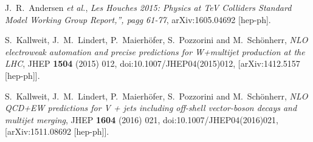 \documentclass{PoS}
\begin{document}
\begin{thebibliography}{99}
  J.~R.~Andersen {\it et al.},
  {\it Les Houches 2015: Physics at TeV Colliders Standard Model Working Group Report,'', pagg 61-77},
  arXiv:1605.04692 [hep-ph].

  S.~Kallweit, J.~M.~Lindert, P.~Maierh\"ofer, S.~Pozzorini and M.~Sch\"onherr,
  {\it NLO electroweak automation and precise predictions for W+multijet production at the LHC},
  JHEP {\bf 1504} (2015) 012,
  doi:10.1007/JHEP04(2015)012,
  [arXiv:1412.5157 [hep-ph]].

  S.~Kallweit, J.~M.~Lindert, P.~Maierh\"ofer, S.~Pozzorini and M.~Sch\"onherr,
  {\it NLO QCD+EW predictions for V + jets including off-shell vector-boson decays and multijet merging},
  JHEP {\bf 1604} (2016) 021,
  doi:10.1007/JHEP04(2016)021,
  [arXiv:1511.08692 [hep-ph]].

\end{thebibliography}
\end{document}
